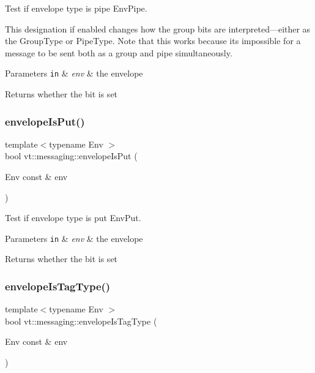 Test if envelope type is pipe {\ttfamily Env\+Pipe}. 

This designation if enabled changes how the group bits are interpreted---either as the {\ttfamily Group\+Type} or {\ttfamily Pipe\+Type}. Note that this works because its impossible for a message to be sent both as a group and pipe simultaneously.


\begin{DoxyParams}[1]{Parameters}
\mbox{\tt in}  & {\em env} & the envelope\\
\hline
\end{DoxyParams}
\begin{DoxyReturn}{Returns}
whether the bit is set 
\end{DoxyReturn}
\mbox{\label{namespacevt_1_1messaging_a0a46a75d45e4f2ad55df0f8b2c2a5f2b}} 
\subsubsection{\texorpdfstring{envelope\+Is\+Put()}{envelopeIsPut()}}
{\footnotesize\ttfamily template$<$typename Env $>$ \\
bool vt\+::messaging\+::envelope\+Is\+Put (\begin{DoxyParamCaption}\item[{Env const \&}]{env }\end{DoxyParamCaption})\hspace{0.3cm}{\ttfamily [inline]}}



Test if envelope type is put {\ttfamily Env\+Put}. 


\begin{DoxyParams}[1]{Parameters}
\mbox{\tt in}  & {\em env} & the envelope\\
\hline
\end{DoxyParams}
\begin{DoxyReturn}{Returns}
whether the bit is set 
\end{DoxyReturn}
\mbox{\label{namespacevt_1_1messaging_a210f23c991eaf84274b744ac109ba72d}} 
\subsubsection{\texorpdfstring{envelope\+Is\+Tag\+Type()}{envelopeIsTagType()}}
{\footnotesize\ttfamily template$<$typename Env $>$ \\
bool vt\+::messaging\+::envelope\+Is\+Tag\+Type (\begin{DoxyParamCaption}\item[{Env const \&}]{env }\end{DoxyParamCaption})\hspace{0.3cm}{\ttfamily [inline]}}



